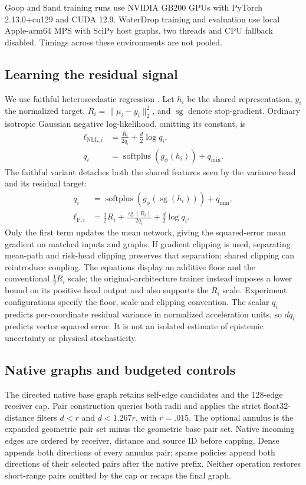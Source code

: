 Goop and Sand training runs use NVIDIA GB200 GPUs with PyTorch 2.13.0+cu129 and CUDA 12.9. WaterDrop training and evaluation use local Apple-arm64 MPS with SciPy host graphs, two threads and CPU fallback disabled. Timings across these environments are not pooled.

\subsection{Learning the residual signal}
We use faithful heteroscedastic regression \citep{stirn2023}. Let $h_i$ be the shared representation, $y_i$ the normalized target, $R_i=\|\mu_i-y_i\|_2^2$, and $\operatorname{sg}$ denote stop-gradient. Ordinary isotropic Gaussian negative log-likelihood, omitting its constant, is
\begin{align}
 \ell_{\mathrm{NLL},i}&=\frac{R_i}{2q_i}+\frac d2\log q_i,\nonumber\\
 q_i&=\operatorname{softplus}(g_\phi(h_i))+q_{\min}.
 \label{eq:nll}
\end{align}
The faithful variant detaches both the shared features seen by the variance head and its residual target:
\begin{align}
 q_i&=\operatorname{softplus}(g_\phi(\operatorname{sg}(h_i)))+q_{\min},\nonumber\\
 \ell_{\mathrm F,i}&=\tfrac12R_i+
 \frac{\operatorname{sg}(R_i)}{2q_i}+\frac d2\log q_i.
 \label{eq:faithful}
\end{align}
Only the first term updates the mean network, giving the squared-error mean gradient on matched inputs and graphs. If gradient clipping is used, separating mean-path and risk-head clipping preserves that separation; shared clipping can reintroduce coupling. The equations display an additive floor and the conventional $\tfrac12R_i$ scale; the original-architecture trainer instead imposes a lower bound on its positive head output and also supports the $R_i$ scale. Experiment configurations specify the floor, scale and clipping convention. The scalar $q_i$ predicts per-coordinate residual variance in normalized acceleration units, so $dq_i$ predicts vector squared error. It is not an isolated estimate of epistemic uncertainty or physical stochasticity.

\subsection{Native graphs and budgeted controls}
The directed native base graph retains self-edge candidates and the 128-edge receiver cap. Pair construction queries both radii and applies the strict float32-distance filters $d<r$ and $d<1.267r$, with $r=.015$. The optional annulus is the expanded geometric pair set minus the geometric base pair set. Native incoming edges are ordered by receiver, distance and source ID before capping. Dense appends both directions of every annulus pair; sparse policies append both directions of their selected pairs after the native prefix. Neither operation restores short-range pairs omitted by the cap or recaps the final graph.


